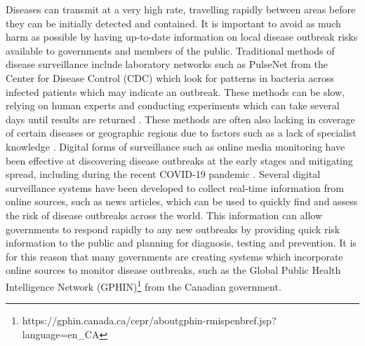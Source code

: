 \documentclass{l4proj}
\begin{document}
Diseases can transmit at a very high rate, travelling rapidly between areas before they can be initially detected and contained. It is important to avoid as much harm as possible by having up-to-date information on local disease outbreak risks available to governments and members of the public. Traditional methods of disease surveillance include laboratory networks such as PulseNet from the Center for Disease Control (CDC) which look for patterns in bacteria across infected patients which may indicate an outbreak. These methods can be slow, relying on human experts and conducting experiments which can take several days until results are returned \citep{swaminathan2001pulsenet}. These methods are often also lacking in coverage of certain diseases or geographic regions due to factors such as a lack of specialist knowledge \citep{abdulraheem2004disease}. Digital forms of surveillance such as online media monitoring have been effective at discovering disease outbreaks at the early stages and mitigating spread, including during the recent COVID-19 pandemic \citep{kostkova2021data}. Several digital surveillance systems have been developed to collect real-time information from online sources, such as news articles, which can be used to quickly find and assess the risk of disease outbreaks across the world. This information can allow governments to respond rapidly to any new outbreaks by providing quick risk information to the public and planning for diagnosis, testing and prevention. It is for this reason that many governments are creating systems which incorporate online sources to monitor disease outbreaks, such as the Global Public Health Intelligence Network (GPHIN)\footnote{https://gphin.canada.ca/cepr/aboutgphin-rmispenbref.jsp?language=en\_CA} from the Canadian government. \par
\end{document}
